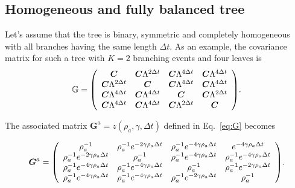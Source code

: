 \documentclass[preprint,amsmath,amssymb,superscriptaddress,showpacs,pre]{revtex4-1}
\let\originalleft\left
\let\originalright\right
\renewcommand{\left}{\mathopen{}\mathclose\bgroup\originalleft}
\renewcommand{\right}{\aftergroup\egroup\originalright}
\begin{document}
 \subsection{Homogeneous and fully balanced tree}
 \label{sub:homogeneous_and_fully_balanced_tree}

Let's assume that the tree is binary, symmetric and completely homogeneous with all branches having the same length $\Delta t$. 
As an example, the covariance matrix for such a tree with $K=2$ branching events and four leaves is
\begin{equation} 
\mathbb{G} =  \left(
\begin{array}{cccc}
{ \bm C} & {\bm C} \Lambda ^{2\Delta t} & {\bm C} \Lambda ^{4\Delta t} & {\bm C} \Lambda ^{4\Delta t} \\
{\bm C} \Lambda ^{2\Delta t} & {\bm C} & {\bm C} \Lambda ^{4\Delta t} & {\bm C} \Lambda ^{4\Delta t} \\
{\bm C} \Lambda ^{4\Delta t} & {\bm C} \Lambda ^{4\Delta t} & {\bm C} & {\bm C} \Lambda ^{2\Delta t} \\
{\bm C} \Lambda ^{4\Delta t} & {\bm C} \Lambda ^{4\Delta t} & {\bm C} \Lambda ^{2\Delta t} & {\bm C} \\
\end{array}\label{eq:G}
\right).
\end{equation}

The associated matrix $\bm G^a=z(\rho_a,\gamma,\Delta t)$  defined in Eq.~\eqref{eq:G} becomes

\begin{equation} 
\bm G^a =  \left(
\begin{array}{cccc}
{  \rho^{-1}_a } & {\rho^{-1}_a } e ^{-2\gamma\rho_a\Delta t} & {\rho^{-1}_a } e ^{-4\gamma\rho_a\Delta t}& {e ^{-4\gamma\rho_a\Delta t}} \\
{\rho^{-1}_a } e ^{-2\gamma\rho_a\Delta t} & {\rho^{-1}_a } & {\rho^{-1}_a } e ^{-4\gamma\rho_a\Delta t} & {\rho^{-1}_a } e ^{-4\gamma\rho_a\Delta t} \\
{\rho^{-1}_a } e ^{-4\gamma\rho_a\Delta t} & {\rho^{-1}_a} e ^{-4\gamma\rho_a\Delta t}& {\rho^{-1}_a } & {\rho^{-1}_a } e ^{-2\gamma\rho_a\Delta t}\\
{\rho^{-1}_a } e ^{-4\gamma\rho_a\Delta t} & {\rho^{-1}_a } e ^{-4\gamma\rho_a\Delta t} & {\rho^{-1}_a } e ^{-2\gamma\rho_a\Delta t} & {\rho^{-1}_a } \\
\end{array}\label{eq:G_a}
\right).
\end{equation}
\end{document}
